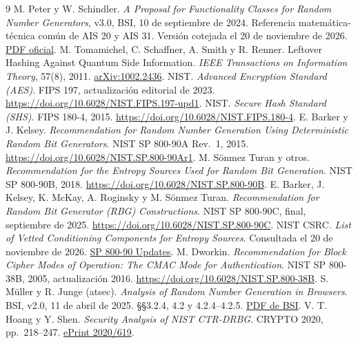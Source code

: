\documentclass[11pt,a4paper]{article}
\begin{document}
\begingroup\footnotesize
\begin{thebibliography}{9}
\setlength{\itemsep}{1pt}
 M. Peter y W. Schindler. \emph{A Proposal for Functionality
Classes for Random Number Generators}, v3.0, BSI, 10 de septiembre de 2024.
Referencia matemática-técnica común de AIS 20 y AIS 31. Versión cotejada
el 20 de noviembre de 2026.
\href{https://www.bsi.bund.de/SharedDocs/Downloads/EN/BSI/Certification/Interpretations/AIS_31_Functionality_classes_for_random_number_generators_e_2024.pdf?__blob=publicationFile\&v=3}{PDF oficial}.
 M. Tomamichel, C. Schaffner, A. Smith y R. Renner.
Leftover Hashing Against Quantum Side Information.
\emph{IEEE Transactions on Information Theory}, 57(8), 2011.
\href{https://arxiv.org/abs/1002.2436}{arXiv:1002.2436}.
 NIST. \emph{Advanced Encryption Standard (AES)}.
FIPS 197, actualización editorial de 2023.
\url{https://doi.org/10.6028/NIST.FIPS.197-upd1}.
 NIST. \emph{Secure Hash Standard (SHS)}.
FIPS 180-4, 2015. \url{https://doi.org/10.6028/NIST.FIPS.180-4}.
 E. Barker y J. Kelsey.
\emph{Recommendation for Random Number Generation Using Deterministic Random Bit Generators}.
NIST SP 800-90A Rev.~1, 2015. \url{https://doi.org/10.6028/NIST.SP.800-90Ar1}.
 M. Sönmez Turan y otros.
\emph{Recommendation for the Entropy Sources Used for Random Bit Generation}.
NIST SP 800-90B, 2018. \url{https://doi.org/10.6028/NIST.SP.800-90B}.
 E. Barker, J. Kelsey, K. McKay, A. Roginsky y M. Sönmez Turan.
\emph{Recommendation for Random Bit Generator (RBG) Constructions}.
NIST SP 800-90C, final, septiembre de 2025.
\url{https://doi.org/10.6028/NIST.SP.800-90C}.
 NIST CSRC. \emph{List of Vetted Conditioning Components for Entropy Sources}.
Consultada el 20 de noviembre de 2026.
\href{https://csrc.nist.gov/Projects/random-bit-generation/sp-800-90-updates}{SP 800-90 Updates}.
 M. Dworkin. \emph{Recommendation for Block Cipher Modes of Operation:
The CMAC Mode for Authentication}. NIST SP 800-38B, 2005, actualización 2016.
\url{https://doi.org/10.6028/NIST.SP.800-38B}.
 S. Müller y R. Junge (atsec).
\emph{Analysis of Random Number Generation in Browsers}. BSI, v2.0,
11 de abril de 2025. §§3.2.4, 4.2 y 4.2.4--4.2.5.
\href{https://www.bsi.bund.de/SharedDocs/Downloads/EN/BSI/Publications/Studies/Zufallszahlenerzeugung_Browser/Zufallszahlenerzeugung_Browser_V2.pdf?__blob=publicationFile\&v=4}{PDF de BSI}.
 V. T. Hoang y Y. Shen.
\emph{Security Analysis of NIST CTR-DRBG}. CRYPTO 2020, pp.~218--247.
\href{https://eprint.iacr.org/2020/619}{ePrint 2020/619}.
\end{thebibliography}
\endgroup
\end{document}
